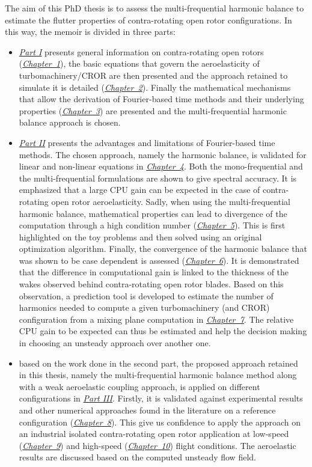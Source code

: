 The aim of this PhD thesis is to assess the
multi-frequential harmonic balance
to estimate the flutter properties of contra-rotating open rotor
configurations. In this way, the memoir is divided in three parts:
\begin{itemize}
	\item \hyperref[part1]{\emph{Part I}} presents general information on 
	contra-rotating open rotors (\hyperref[cha:cror]{\emph{Chapter~1}}),
	the basic equations that govern the aeroelasticity of
	turbomachinery/CROR are then presented and the approach retained 
	to simulate it is detailed (\hyperref[cha:ael]{\emph{Chapter~2}}).
	Finally the mathematical mechanisms that allow the derivation
	of Fourier-based time methods and their underlying properties
	(\hyperref[cha:spectral_methods]{\emph{Chapter~3}}) are presented and the 
	multi-frequential harmonic balance approach is chosen.
	\item \hyperref[part2]{\emph{Part II}} 
	presents the advantages and limitations
	of Fourier-based time methods. The chosen approach, namely
	the harmonic balance, is validated for linear and non-linear
	equations in \hyperref[cha:validation_hb]{\emph{Chapter~4}}. Both the
	mono-frequential and the multi-frequential formulations
	are shown to give spectral accuracy.
	It is emphasized
	that a large CPU gain can be expected in the
	case of contra-rotating open rotor aeroelasticity. 
	Sadly, when using the multi-frequential harmonic
	balance, mathematical properties can lead to divergence
	of the computation through a high condition number
	(\hyperref[cha:limitations_condition_number]{\emph{Chapter~5}}). This is 
	first highlighted on the toy problems and then solved using
	an original optimization algorithm.
	Finally, the convergence of the harmonic balance 
	that was shown to be case dependent is
	assessed (\hyperref[cha:limitations_convergence]{\emph{Chapter~6}}). 
	It is demonstrated that the difference in computational
	gain is linked to the thickness of the wakes observed behind
	contra-rotating open rotor blades. Based on this observation,
	a prediction tool is developed to estimate the
	number of harmonics needed to compute a given turbomachinery (and CROR)
	configuration from a mixing plane computation in 
	\hyperref[cha:model_tbm]{\emph{Chapter~7}}. 
	The relative CPU gain to be expected can thus be estimated
	and help the decision making in choosing an unsteady approach
	over another one.
	\item based on the work done in the second part,
	the proposed approach retained in this thesis, 
	namely the multi-frequential harmonic balance method along with a weak 
	aeroelastic coupling approach, is applied on different configurations
	in \hyperref[part3]{\emph{Part III}}. Firstly, it is validated against experimental 
	results and other numerical approaches found in the
	literature on a reference configuration
	(\hyperref[cha:stcf11]{\emph{Chapter~8}}). This give us confidence
	to apply the approach on an industrial isolated contra-rotating
	open rotor application at low-speed (\hyperref[cha:dream_ls_isolated]{\emph{Chapter~9}})
	and high-speed (\hyperref[cha:dream_hs_isolated]{\emph{Chapter~10}})
	flight conditions. The aeroelastic results are discussed based
	on the computed unsteady flow field.
\end{itemize}
